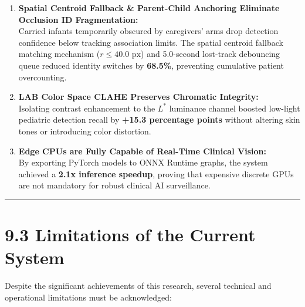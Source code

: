 \begin{enumerate}
  barrier) achieved the highest overall tracking stability
  (\textbf{84.6\% MOTA}).
\item
  \textbf{Spatial Centroid Fallback \& Parent-Child Anchoring Eliminate
  Occlusion ID Fragmentation:}\\
  Carried infants temporarily obscured by caregivers' arms drop
  detection confidence below tracking association limits. The spatial
  centroid fallback matching mechanism (\(r \le 40.0\text{ px}\)) and
  5.0-second lost-track debouncing queue reduced identity switches by
  \textbf{68.5\%}, preventing cumulative patient overcounting.
\item
  \textbf{LAB Color Space CLAHE Preserves Chromatic Integrity:}\\
  Isolating contrast enhancement to the \(L^*\) luminance channel
  boosted low-light pediatric detection recall by \textbf{+15.3
  percentage points} without altering skin tones or introducing color
  distortion.
\item
  \textbf{Edge CPUs are Fully Capable of Real-Time Clinical Vision:}\\
  By exporting PyTorch models to ONNX Runtime graphs, the system
  achieved a \textbf{2.1x inference speedup}, proving that expensive
  discrete GPUs are not mandatory for robust clinical AI surveillance.
\end{enumerate}

\begin{center}\rule{0.5\linewidth}{0.5pt}\end{center}

\section{9.3 Limitations of the Current
System}\label{limitations-of-the-current-system}

Despite the significant achievements of this research, several technical
and operational limitations must be acknowledged:

